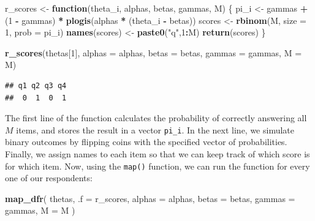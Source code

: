 \documentclass[
]{book}
\newenvironment{Shaded}{\begin{snugshade}}{\end{snugshade}}
\newcommand{\AttributeTok}[1]{\textcolor[rgb]{0.13,0.29,0.53}{#1}}
\newcommand{\ControlFlowTok}[1]{\textcolor[rgb]{0.13,0.29,0.53}{\textbf{#1}}}
\newcommand{\DecValTok}[1]{\textcolor[rgb]{0.00,0.00,0.81}{#1}}
\newcommand{\FunctionTok}[1]{\textcolor[rgb]{0.13,0.29,0.53}{\textbf{#1}}}
\newcommand{\NormalTok}[1]{#1}
\newcommand{\OtherTok}[1]{\textcolor[rgb]{0.56,0.35,0.01}{#1}}
\newcommand{\SpecialCharTok}[1]{\textcolor[rgb]{0.81,0.36,0.00}{\textbf{#1}}}
\newcommand{\StringTok}[1]{\textcolor[rgb]{0.31,0.60,0.02}{#1}}
\begin{document}
\begin{Shaded}
\begin{Highlighting}[]
\NormalTok{r\_scores }\OtherTok{\textless{}{-}} \ControlFlowTok{function}\NormalTok{(theta\_i, alphas, betas, gammas, M) \{}
\NormalTok{  pi\_i }\OtherTok{\textless{}{-}}\NormalTok{ gammas }\SpecialCharTok{+}\NormalTok{ (}\DecValTok{1} \SpecialCharTok{{-}}\NormalTok{ gammas) }\SpecialCharTok{*} \FunctionTok{plogis}\NormalTok{(alphas }\SpecialCharTok{*}\NormalTok{ (theta\_i }\SpecialCharTok{{-}}\NormalTok{ betas))}
\NormalTok{  scores }\OtherTok{\textless{}{-}} \FunctionTok{rbinom}\NormalTok{(M, }\AttributeTok{size =} \DecValTok{1}\NormalTok{, }\AttributeTok{prob =}\NormalTok{ pi\_i)}
  \FunctionTok{names}\NormalTok{(scores) }\OtherTok{\textless{}{-}} \FunctionTok{paste0}\NormalTok{(}\StringTok{"q"}\NormalTok{,}\DecValTok{1}\SpecialCharTok{:}\NormalTok{M)}
  \FunctionTok{return}\NormalTok{(scores)}
\NormalTok{\}}

\FunctionTok{r\_scores}\NormalTok{(thetas[}\DecValTok{1}\NormalTok{], }\AttributeTok{alphas =}\NormalTok{ alphas, }\AttributeTok{betas =}\NormalTok{ betas, }
         \AttributeTok{gammas =}\NormalTok{ gammas, }\AttributeTok{M =}\NormalTok{ M)}
\end{Highlighting}
\end{Shaded}

\begin{verbatim}
## q1 q2 q3 q4 
##  0  1  0  1
\end{verbatim}

The first line of the function calculates the probability of correctly answering all \(M\) items, and stores the result in a vector \texttt{pi\_i}.
In the next line, we simulate binary outcomes by flipping coins with the specified vector of probabilities.
Finally, we assign names to each item so that we can keep track of which score is for which item.
Now, using the \texttt{map()} function, we can run the function for every one of our respondents:

\begin{Shaded}
\begin{Highlighting}[]
\FunctionTok{map\_dfr}\NormalTok{(}
\NormalTok{  thetas, }\AttributeTok{.f =}\NormalTok{ r\_scores, }
  \AttributeTok{alphas =}\NormalTok{ alphas, }\AttributeTok{betas =}\NormalTok{ betas, }\AttributeTok{gammas =}\NormalTok{ gammas, }\AttributeTok{M =}\NormalTok{ M}
\NormalTok{)}
\end{Highlighting}
\end{Shaded}
\end{document}

